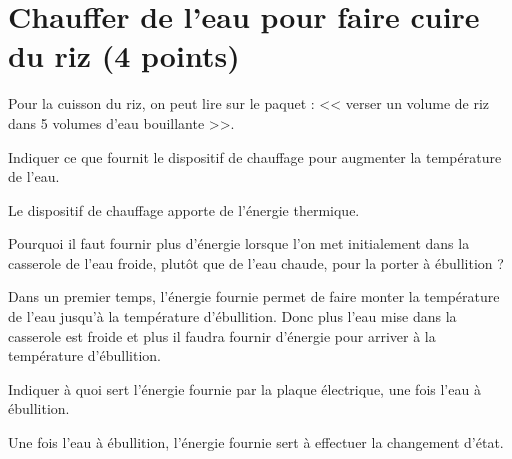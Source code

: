 \section{Chauffer de l'eau pour faire cuire du riz (4 points)}

Pour la cuisson du riz, on peut lire sur le paquet : << verser un volume de riz dans 5 volumes d'eau bouillante >>.

\begin{questions}
	\question[1\half] Indiquer ce que fournit le dispositif de chauffage pour augmenter la température de l'eau.
	\begin{solution}
		Le dispositif de chauffage apporte de l'énergie thermique.
	\end{solution}
	
	\question[1\half] Pourquoi il faut fournir plus d'énergie lorsque l'on met initialement dans la casserole de l'eau froide, plutôt que de l'eau chaude, pour la porter à ébullition ?
	\begin{solution}
		Dans un premier temps, l'énergie fournie permet de faire monter la température de l'eau jusqu'à la température d'ébullition. Donc plus l'eau mise dans la casserole est froide et plus il faudra fournir d'énergie pour arriver à la température d'ébullition.
	\end{solution}
	
	\question[1] Indiquer à quoi sert l'énergie fournie par la plaque électrique, une fois l'eau à ébullition.
	\begin{solution}
		Une fois l'eau à ébullition, l'énergie fournie sert à effectuer la changement d'état.
	\end{solution}
\end{questions}